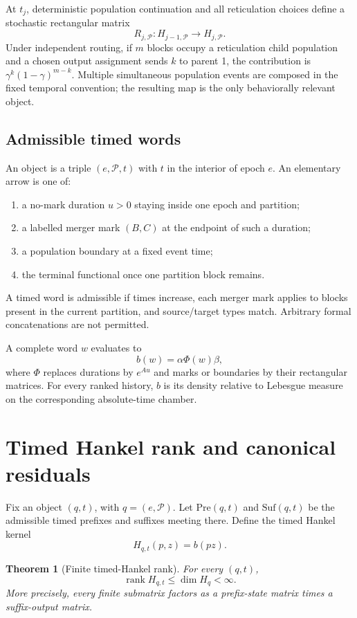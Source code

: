 \documentclass[11pt]{article}
\newtheorem{theorem}{Theorem}[section]
\newcommand{\rank}{\operatorname{rank}}
\newcommand{\cP}{\mathcal P}
\begin{document}
At $t_j$, deterministic population continuation and all reticulation choices define a stochastic rectangular matrix
\[
R_{j,\cP}:H_{j-1,\cP}\to H_{j,\cP}.
\]
Under independent routing, if $m$ blocks occupy a reticulation child population and a chosen output assignment sends $k$ to parent 1, the contribution is $\gamma^k(1-\gamma)^{m-k}$.  Multiple simultaneous population events are composed in the fixed temporal convention; the resulting map is the only behaviorally relevant object.

\subsection{Admissible timed words}

An object is a triple $(e,\cP,t)$ with $t$ in the interior of epoch $e$.  An elementary arrow is one of:
\begin{enumerate}[label=(\alph*)]
\item a no-mark duration $u>0$ staying inside one epoch and partition;
\item a labelled merger mark $(B,C)$ at the endpoint of such a duration;
\item a population boundary at a fixed event time;
\item the terminal functional once one partition block remains.
\end{enumerate}
A timed word is admissible if times increase, each merger mark applies to blocks present in the current partition, and source/target types match.  Arbitrary formal concatenations are not permitted.

A complete word $w$ evaluates to
\[
b(w)=\alpha\Phi(w)\beta,
\]
where $\Phi$ replaces durations by $e^{Au}$ and marks or boundaries by their rectangular matrices.  For every ranked history, $b$ is its density relative to Lebesgue measure on the corresponding absolute-time chamber.

\section{Timed Hankel rank and canonical residuals}

Fix an object $(q,t)$, with $q=(e,\cP)$.  Let $\mathrm{Pre}(q,t)$ and $\mathrm{Suf}(q,t)$ be the admissible timed prefixes and suffixes meeting there.  Define the timed Hankel kernel
\[
H_{q,t}(p,z)=b(pz).
\]

\begin{theorem}[Finite timed-Hankel rank]
\label{thm:hankel-rank}
For every $(q,t)$,
\[
\rank H_{q,t}\le \dim H_q<\infty.
\]
More precisely, every finite submatrix factors as a prefix-state matrix times a suffix-output matrix.
\end{theorem}
\end{document}
